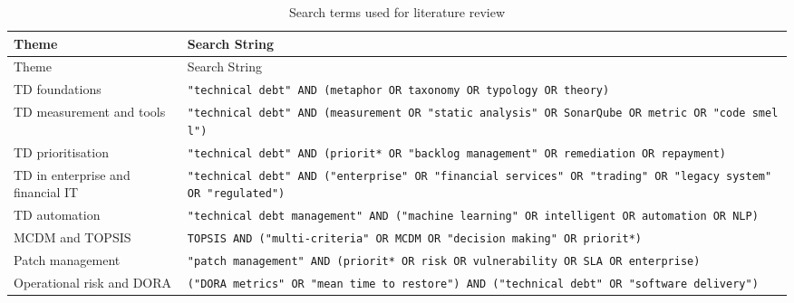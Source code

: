 \documentclass[
  british,
  12pt,
  a4paper,
]{report}
\begin{document}
\begin{longtable}[]{@{}
  >{\raggedright\arraybackslash}p{}
  >{\raggedright\arraybackslash}p{}@{}}
\caption{Search terms used for literature
review}\label{tbl-search}\tabularnewline
\toprule\noalign{}
\begin{minipage}[b]{\linewidth}\raggedright
Theme
\end{minipage} & \begin{minipage}[b]{\linewidth}\raggedright
Search String
\end{minipage} \\
\midrule\noalign{}
\endfirsthead
\toprule\noalign{}
\begin{minipage}[b]{\linewidth}\raggedright
Theme
\end{minipage} & \begin{minipage}[b]{\linewidth}\raggedright
Search String
\end{minipage} \\
\midrule\noalign{}
\endhead
\bottomrule\noalign{}
\endlastfoot
TD foundations &
\texttt{"technical\ debt"\ AND\ (metaphor\ OR\ taxonomy\ OR\ typology\ OR\ theory)} \\
TD measurement and tools &
\texttt{"technical\ debt"\ AND\ (measurement\ OR\ "static\ analysis"\ OR\ SonarQube\ OR\ metric\ OR\ "code\ smell")} \\
TD prioritisation &
\texttt{"technical\ debt"\ AND\ (priorit*\ OR\ "backlog\ management"\ OR\ remediation\ OR\ repayment)} \\
TD in enterprise and financial IT &
\texttt{"technical\ debt"\ AND\ ("enterprise"\ OR\ "financial\ services"\ OR\ "trading"\ OR\ "legacy\ system"\ OR\ "regulated")} \\
TD automation &
\texttt{"technical\ debt\ management"\ AND\ ("machine\ learning"\ OR\ intelligent\ OR\ automation\ OR\ NLP)} \\
MCDM and TOPSIS &
\texttt{TOPSIS\ AND\ ("multi-criteria"\ OR\ MCDM\ OR\ "decision\ making"\ OR\ priorit*)} \\
Patch management &
\texttt{"patch\ management"\ AND\ (priorit*\ OR\ risk\ OR\ vulnerability\ OR\ SLA\ OR\ enterprise)} \\
Operational risk and DORA &
\texttt{("DORA\ metrics"\ OR\ "mean\ time\ to\ restore")\ AND\ ("technical\ debt"\ OR\ "software\ delivery")} \\
\end{longtable}
\end{document}
